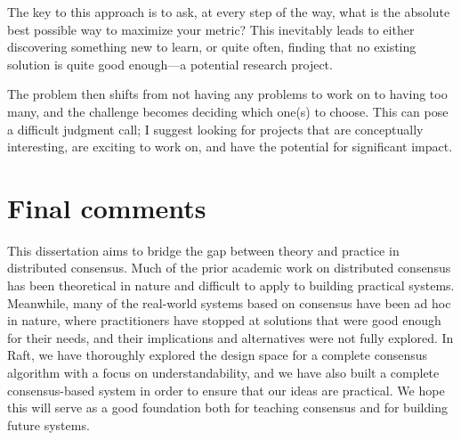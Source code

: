 The key to this approach is to ask, at every step of the way, what is
the absolute best possible way to maximize your metric? This inevitably
leads to either discovering something new to learn, or quite often,
finding that no existing solution is quite good enough---a potential
research project.

The problem then shifts from not having any problems to work on to
having too many, and the challenge becomes deciding which one(s) to
choose. This can pose a difficult judgment call; I suggest looking for
projects that are conceptually interesting, are exciting to work on, and
have the potential for significant impact.

\section{Final comments}

This dissertation aims to bridge the gap between theory and practice in
distributed consensus. Much of the prior academic work on distributed
consensus has been theoretical in nature and difficult to apply to
building practical systems. Meanwhile, many of the real-world systems
based on consensus have been ad hoc in nature, where
practitioners have stopped at solutions that were good enough for their
needs, and their implications and alternatives were not fully explored.
In Raft, we have thoroughly explored the design space for a complete
consensus algorithm with a focus on understandability, and we have also
built a complete consensus-based system in order to ensure that our
ideas are practical. We hope this will serve as a good foundation both
for teaching consensus and for building future systems.
